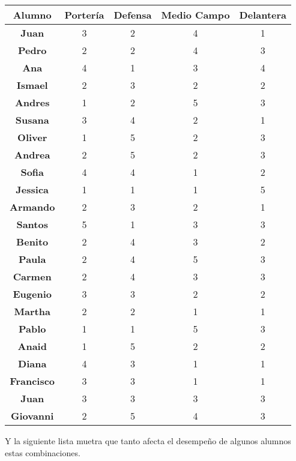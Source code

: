 \documentclass[10pt,letterpaper,twoside,openright]{article}
\begin{document}
	\begin{tabular}{c||cccc}
	\textbf{Alumno} & \textbf{Portería} & \textbf{Defensa} &\textbf{Medio Campo} & \textbf{Delantera} \\ 
	\hline	\hline 
	\textbf{Juan} & 3 & 2 & 4 & 1 \\ 
	\hline 
	\textbf{Pedro} & 2 & 2 & 4 & 3 \\ 
	\hline 
	\textbf{Ana} & 4 & 1 & 3 & 4 \\ 
	\hline 
	\textbf{Ismael} & 2 & 3 & 2 & 2 \\ 
	\hline 
	\textbf{Andres} & 1 & 2 & 5 & 3 \\ 
	\hline 
	\textbf{Susana} & 3 & 4 & 2 & 1 \\ 
	\hline 
	\textbf{Oliver} & 1 & 5 & 2 & 3 \\ 
	\hline 
	\textbf{Andrea} & 2 & 5 & 2 & 3 \\ 
	\hline 
	\textbf{Sofia} & 4 & 4 & 1 & 2 \\ 
	\hline 
	\textbf{Jessica} & 1 & 1 & 1 & 5 \\ 
	\hline 
	\textbf{Armando} & 2 & 3 & 2 & 1 \\ 
	\hline 
	\textbf{Santos} & 5 & 1 & 3 & 3 \\ 
	\hline 
	\textbf{Benito} & 2 & 4 & 3 & 2 \\ 
	\hline 
	\textbf{Paula} & 2 & 4 & 5 & 3 \\ 
	\hline 
	\textbf{Carmen} & 2 & 4 & 3 & 3 \\ 
	\hline 
	\textbf{Eugenio} & 3 & 3 & 2 & 2 \\ 
	\hline 
	\textbf{Martha} & 2 & 2 & 1 & 1 \\ 
	\hline 
	\textbf{Pablo} & 1 & 1 & 5 & 3 \\ 
	\hline 
	\textbf{Anaid} & 1 & 5 & 2 & 2 \\ 
	\hline 
	\textbf{Diana} & 4 & 3 & 1 & 1 \\ 
	\hline 
	\textbf{Francisco} & 3 & 3 & 1 & 1 \\ 
	\hline 
	\textbf{Juan} & 3 & 3 & 3 & 3 \\ 
	\hline 
	\textbf{Giovanni} & 2 & 5 & 4 & 3 \\ 
	\hline 
	\end{tabular} 
	
	Y la siguiente lista muetra que tanto afecta el desempeño de algunos alumnos estas combinaciones.
	
\end{document}
